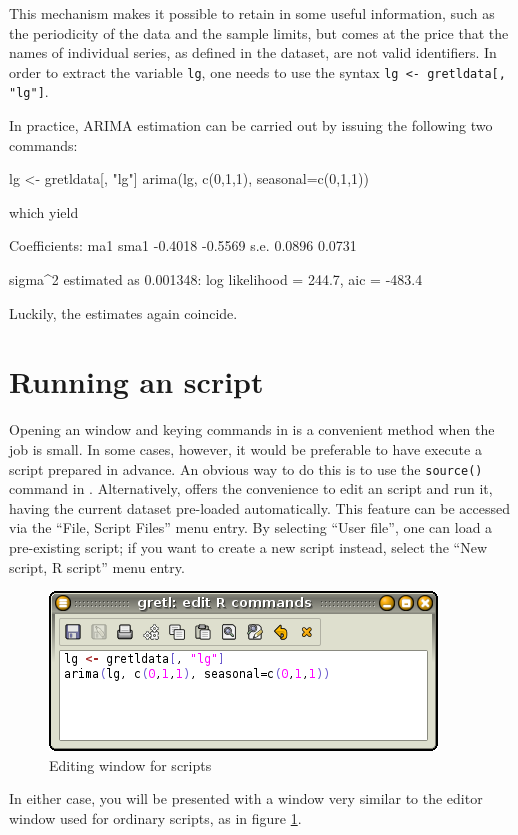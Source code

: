 This mechanism makes it possible to retain in  some useful
information, such as the periodicity of the data and the sample
limits, but comes at the price that the names of individual series, as
defined in the  dataset, are not valid identifiers. In
order to extract the variable \texttt{lg}, one needs to use the syntax
\verb|lg <- gretldata[, "lg"]|.

In practice, ARIMA estimation can be carried out by issuing the
following two  commands:
\begin{code}
lg <- gretldata[, "lg"]
arima(lg, c(0,1,1), seasonal=c(0,1,1))
\end{code}

which yield

\begin{code}
Coefficients:
          ma1     sma1
      -0.4018  -0.5569
s.e.   0.0896   0.0731

sigma^2 estimated as 0.001348:  log likelihood = 244.7,  aic = -483.4
\end{code}

Luckily, the estimates again coincide.

\section{Running an  script}
\label{sec:R-scripts}

Opening an  window and keying commands in is a convenient
method when the job is small. In some cases, however, it would be
preferable to have  execute a script prepared in advance. An
obvious way to do this is to use the \texttt{source()} command in
. Alternatively,  offers the convenience to edit an
 script and run it, having the current dataset pre-loaded
automatically. This feature can be accessed via the ``File, Script
Files'' menu entry. By selecting ``User file'', one can load a
pre-existing  script; if you want to create a new script
instead, select the ``New script, R script'' menu entry.

\begin{figure}[htbp]
  \centering
  \includegraphics[scale=0.7]{figures/R-edit1}
  \caption{Editing window for  scripts}
  \label{fig:R-edit1}
\end{figure}
In either case, you will be presented with a window very similar to
the editor window used for ordinary  scripts, as in figure
\ref{fig:R-edit1}. 

